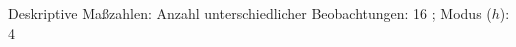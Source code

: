 				\label{tableValues:bstu17}
				\vspace*{-\baselineskip}
                    \begin{noten}
                	    \note{} Deskriptive Maßzahlen:
                	    Anzahl unterschiedlicher Beobachtungen: 16%
                	    ; 
                	      Modus ($h$): 4
                     \end{noten}

